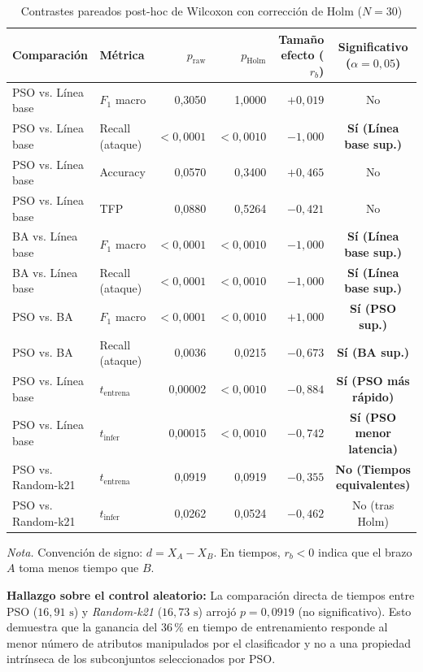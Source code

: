 \documentclass[11pt,a4paper]{article}
\newcommand{\tabfont}{\small\setstretch{1}}
\begin{document}
\begin{table}[ht]
\tabfont
\caption{Contrastes pareados post-hoc de Wilcoxon con corrección de Holm ($N = 30$)}
\label{tab:est}
\begin{tabular}{@{}llrrrc@{}}
\toprule
Comparación & Métrica & $p_{\text{raw}}$ & $p_{\text{Holm}}$ & Tamaño efecto ($r_b$) & Significativo ($\alpha=0{,}05$) \\
\midrule
PSO vs. Línea base & $F_1$ macro & 0,3050 & 1,0000 & $+0{,}019$ & No \\
PSO vs. Línea base & Recall (ataque) & $< 0{,}0001$ & $< 0{,}0010$ & $-1{,}000$ & \textbf{Sí (Línea base sup.)} \\
PSO vs. Línea base & Accuracy & 0,0570 & 0,3400 & $+0{,}465$ & No \\
PSO vs. Línea base & TFP & 0,0880 & 0,5264 & $-0{,}421$ & No \\
BA vs. Línea base  & $F_1$ macro & $< 0{,}0001$ & $< 0{,}0010$ & $-1{,}000$ & \textbf{Sí (Línea base sup.)} \\
BA vs. Línea base  & Recall (ataque) & $< 0{,}0001$ & $< 0{,}0010$ & $-1{,}000$ & \textbf{Sí (Línea base sup.)} \\
PSO vs. BA         & $F_1$ macro & $< 0{,}0001$ & $< 0{,}0010$ & $+1{,}000$ & \textbf{Sí (PSO sup.)} \\
PSO vs. BA         & Recall (ataque) & 0,0036 & 0,0215 & $-0{,}673$ & \textbf{Sí (BA sup.)} \\
\midrule
PSO vs. Línea base & $t_{\text{entrena}}$ & 0,00002 & $< 0{,}0010$ & $-0{,}884$ & \textbf{Sí (PSO más rápido)} \\
PSO vs. Línea base & $t_{\text{infer}}$ & 0,00015 & $< 0{,}0010$ & $-0{,}742$ & \textbf{Sí (PSO menor latencia)} \\
PSO vs. Random-k21 & $t_{\text{entrena}}$ & 0,0919 & 0,0919 & $-0{,}355$ & \textbf{No (Tiempos equivalentes)} \\
PSO vs. Random-k21 & $t_{\text{infer}}$ & 0,0262 & 0,0524 & $-0{,}462$ & No (tras Holm) \\
\bottomrule
\end{tabular}

\smallskip
\footnotesize\emph{Nota.} Convención de signo: $d = X_A - X_B$. En tiempos, $r_b < 0$ indica que el brazo $A$ toma menos tiempo que $B$.
\end{table}

\noindent\textbf{Hallazgo sobre el control aleatorio:}
La comparación directa de tiempos entre PSO ($16{,}91\text{ s}$) y \emph{Random-k21} ($16{,}73\text{ s}$) arrojó $p = 0{,}0919$ (no significativo). Esto demuestra que la ganancia del 36\,\% en tiempo de entrenamiento responde al menor número de atributos manipulados por el clasificador y no a una propiedad intrínseca de los subconjuntos seleccionados por PSO.
\end{document}
